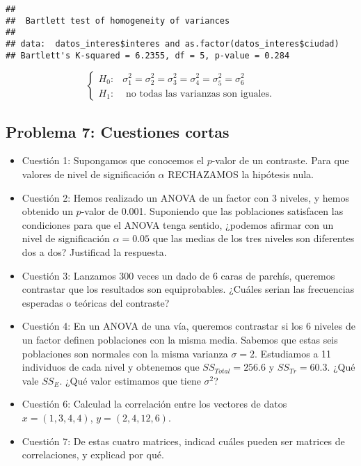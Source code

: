 \documentclass[
]{article}
\newenvironment{Shaded}{\begin{snugshade}}{\end{snugshade}}
\newcommand{\KeywordTok}[1]{\textcolor[rgb]{0.13,0.29,0.53}{\textbf{#1}}}
\newcommand{\NormalTok}[1]{#1}
\newcommand{\OperatorTok}[1]{\textcolor[rgb]{0.81,0.36,0.00}{\textbf{#1}}}
\providecommand{\tightlist}{%
  \setlength{\itemsep}{0pt}\setlength{\parskip}{0pt}}
\begin{document}
\begin{Shaded}
\end{Shaded}

\begin{verbatim}
## 
##  Bartlett test of homogeneity of variances
## 
## data:  datos_interes$interes and as.factor(datos_interes$ciudad)
## Bartlett's K-squared = 6.2355, df = 5, p-value = 0.284
\end{verbatim}

\[
\left\{
\begin{array}{ll}
H_0: &  \sigma^2_1=\sigma^2_2=\sigma^2_3=\sigma^2_4=\sigma^2_5=\sigma^2_6\\
H_1: & \mbox{ no  todas las varianzas son iguales}.
\end{array}
\right.
\]

\hypertarget{problema-7-cuestiones-cortas}{%
\subsection{Problema 7: Cuestiones
cortas}\label{problema-7-cuestiones-cortas}}

\begin{itemize}
\tightlist
\item
  Cuestión 1: Supongamos que conocemos el \(p\)-valor de un contraste.
  Para que valores de nivel de significación \(\alpha\) RECHAZAMOS la
  hipótesis nula.
\item
  Cuestión 2: Hemos realizado un ANOVA de un factor con 3 niveles, y
  hemos obtenido un \(p\)-valor de 0.001. Suponiendo que las poblaciones
  satisfacen las condiciones para que el ANOVA tenga sentido, ¿podemos
  afirmar con un nivel de significación \(\alpha= 0.05\) que las medias
  de los tres niveles son diferentes dos a dos? Justificad la respuesta.
\item
  Cuestión 3: Lanzamos 300 veces un dado de 6 caras de parchís, queremos
  contrastar que los resultados son equiprobables. ¿Cuáles serian las
  frecuencias esperadas o teóricas del contraste?
\item
  Cuestión 4: En un ANOVA de una vía, queremos contrastar si los 6
  niveles de un factor definen poblaciones con la misma media. Sabemos
  que estas seis poblaciones son normales con la misma varianza
  \(\sigma=2\). Estudiamos a 11 individuos de cada nivel y obtenemos que
  \(SS_{Total}=256.6\) y \(SS_{Tr}=60.3\). ¿Qué vale \(SS_E\). ¿Qué
  valor estimamos que tiene \(\sigma^2\)?
\item
  Cuestión 6: Calculad la correlación entre los vectores de datos
  \(x=(1,3,4,4)\), \(y=(2,4,12,6)\).
\item
  Cuestión 7: De estas cuatro matrices, indicad cuáles pueden ser
  matrices de correlaciones, y explicad por qué.
\end{itemize}
\end{document}

